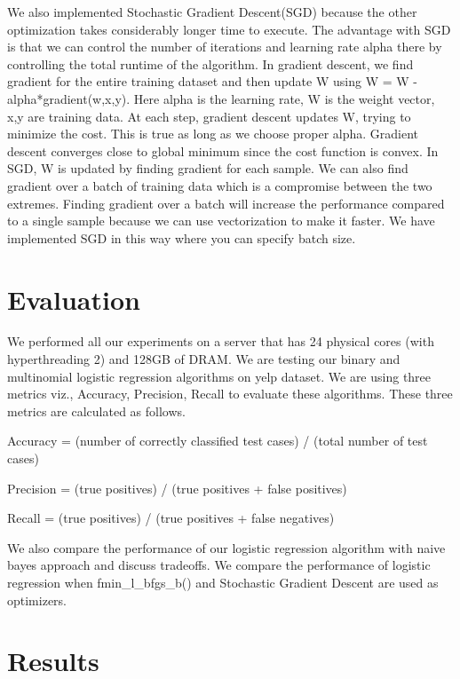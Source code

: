 \documentclass{article}
\begin{document}
We also implemented Stochastic Gradient Descent(SGD) because the other optimization takes considerably longer time to execute. The advantage with SGD is that we can control the number of iterations and learning rate alpha there by controlling the total runtime of the algorithm. In gradient descent, we find gradient for the entire training dataset and then update W using W = W - alpha*gradient(w,x,y). Here alpha is the learning rate, W is the weight vector, x,y are training data. At each step, gradient descent updates W, trying to minimize the cost. This is true as long as we choose proper alpha. Gradient descent converges close to global minimum since the cost function is convex. In SGD, W is updated by finding gradient for each sample. We can also find gradient over a batch of training data which is a compromise between the two extremes. Finding gradient over a batch will increase the performance compared to a single sample because we can use vectorization to make it faster. We have implemented SGD in this way where you can specify batch size.
\section{Evaluation}

We performed all our experiments on a server that has 24 physical cores (with hyperthreading 2) and 128GB of DRAM. We are testing our binary and multinomial logistic regression algorithms on yelp dataset. We are using three metrics viz., Accuracy, Precision, Recall to evaluate these algorithms. These three metrics are calculated as follows.


Accuracy = (number of correctly classified test cases) / (total number of test cases) 


Precision = (true positives) / (true positives + false positives)


Recall =  (true positives) / (true positives + false negatives)


We also compare the performance of our logistic regression algorithm with naive bayes approach and discuss tradeoffs. We compare the performance of logistic regression when fmin\_l\_bfgs\_b() and Stochastic Gradient Descent are used as optimizers.

\section{Results}
\end{document}
